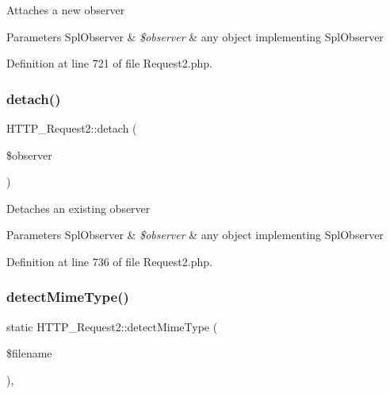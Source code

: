 Attaches a new observer


\begin{DoxyParams}[1]{Parameters}
Spl\+Observer & {\em \$observer} & any object implementing Spl\+Observer \\
\hline
\end{DoxyParams}


Definition at line 721 of file Request2.\+php.

\hypertarget{classHTTP__Request2_a43da613f3526bfe033f5fafd58f9c50c}{}\label{classHTTP__Request2_a43da613f3526bfe033f5fafd58f9c50c} 
\subsubsection{\texorpdfstring{detach()}{detach()}}
{\footnotesize\ttfamily H\+T\+T\+P\+\_\+\+Request2\+::detach (\begin{DoxyParamCaption}\item[{Spl\+Observer}]{\$observer }\end{DoxyParamCaption})}

Detaches an existing observer


\begin{DoxyParams}[1]{Parameters}
Spl\+Observer & {\em \$observer} & any object implementing Spl\+Observer \\
\hline
\end{DoxyParams}


Definition at line 736 of file Request2.\+php.

\hypertarget{classHTTP__Request2_ac1b8f0776d5faf41503d440350c8b6d6}{}\label{classHTTP__Request2_ac1b8f0776d5faf41503d440350c8b6d6} 
\subsubsection{\texorpdfstring{detect\+Mime\+Type()}{detectMimeType()}}
{\footnotesize\ttfamily static H\+T\+T\+P\+\_\+\+Request2\+::detect\+Mime\+Type (\begin{DoxyParamCaption}\item[{}]{\$filename }\end{DoxyParamCaption})\hspace{0.3cm}{\ttfamily [static]}, {\ttfamily [protected]}}

